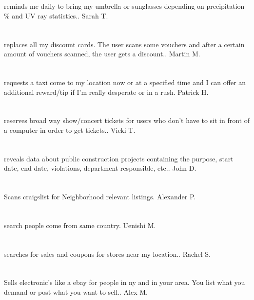 \section{}reminds me daily to bring my umbrella or sunglasses depending on precipitation \% and UV ray statistics.. Sarah T.
\section{}replaces all my discount cards. The user scans some vouchers and after a certain amount of vouchers scanned,  the user gets a discount.. Martin M.
\section{}requests a taxi come to my location now or at a specified time and I can offer an additional reward/tip if I'm really desperate or in a rush. Patrick H.
\section{}reserves broad way show/concert tickets for users who don't have to sit in front of a computer in order to get tickets.. Vicki T.
\section{}reveals data about public construction projects containing the purpose,  start date,  end date,  violations,  department responsible,  etc.. John D.
\section{}Scans craigslist for Neighborhood relevant listings. Alexander P.
\section{}search people come from same country. Uenishi M.
\section{}searches for sales and coupons for stores near my location.. Rachel S.
\section{}Sells electronic's like a ebay for people in ny and in your area. You list what you demand or post what you want to sell.. Alex M.
